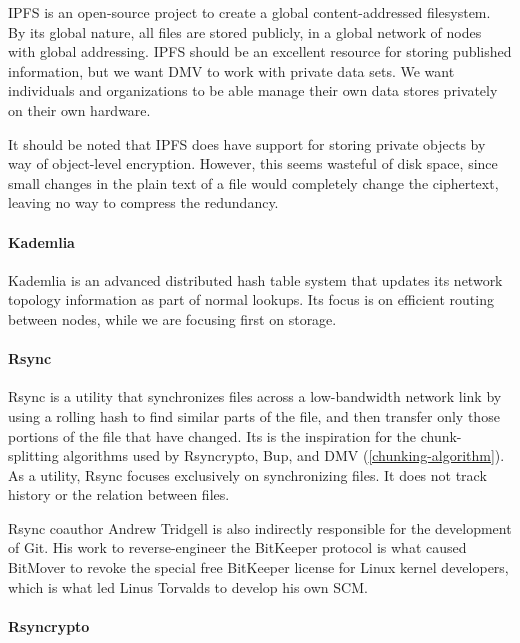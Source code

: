 IPFS \cite{ipfs_github_main} is an open-source project to create a global
content-addressed filesystem. By its global nature, all files are stored
publicly, in a global network of nodes with global addressing. IPFS should be an
excellent resource for storing published information, but we want \gls{DMV} to
work with private data sets. We want individuals and organizations to be able
manage their own data stores privately on their own hardware.

It should be noted that IPFS does have support for storing private objects by
way of object-level encryption. However, this seems wasteful of disk space,
since small changes in the plain text of a file would completely change the
ciphertext, leaving no way to compress the redundancy.


\paragraph{Kademlia}

Kademlia \cite{Maymounkov2002} is an advanced distributed hash table system that
updates its network topology information as part of normal lookups. Its focus is
on efficient routing between nodes, while we are focusing first on storage.


\paragraph{Rsync}
\label{related-rsync}

Rsync\cite{rsynctechreport} is a utility that synchronizes files across a
low-bandwidth network link by using a rolling hash to find similar parts of the
file, and then transfer only those portions of the file that have changed. Its
 is the inspiration for the chunk-splitting algorithms
used by Rsyncrypto\cite{rsyncrypto_algorithm}, Bup\cite{bup_design}, and
\gls{DMV} (\autoref{chunking-algorithm}). As a utility, Rsync focuses
exclusively on synchronizing files. It does not track history or the relation
between files.

Rsync coauthor Andrew Tridgell is also indirectly responsible for the
development of Git. His work to reverse-engineer the BitKeeper protocol is what
caused BitMover to revoke the special free BitKeeper license for Linux kernel
developers, which is what led Linus Torvalds to develop his own
\gls{SCM}\cite{git_10_years_interview}.


\paragraph{Rsyncrypto}
\label{related-rsyncrypto}

